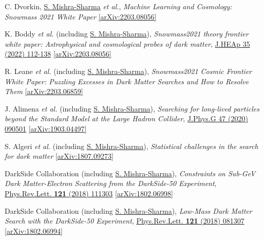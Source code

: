 \documentclass[letterpaper,11pt]{article}
\newenvironment{packed_enumerate}[1][]{
\begin{etaremune}[#1]
  \setlength{\itemsep}{3.7pt}
  \setlength{\parskip}{0pt}
  \setlength{\parsep}{0pt}}{\end{etaremune}
}
\begin{document}
\begin{packed_enumerate}[start=7]

  \item C. Dvorkin, \underline{S. Mishra-Sharma} \emph{et al.}, \emph{Machine Learning and Cosmology: Snowmass 2021 White Paper} \href{https://arxiv.org/abs/2203.08056}{[arXiv:2203.08056]}

  \item K. Boddy \emph{et al.} (including \underline{S. Mishra-Sharma}), \emph{Snowmass2021 theory frontier white paper: Astrophysical and cosmological probes of dark matter},  \href{https://www.sciencedirect.com/science/article/pii/S2214404822000349}{J.HEAp 35 (2022) 112-138}  \href{https://arxiv.org/abs/2203.08056}{[arXiv:2203.08056]}

  \item R. Leane \emph{et al.} (including \underline{S. Mishra-Sharma}), \emph{Snowmass2021 Cosmic Frontier White Paper: Puzzling Excesses in Dark Matter Searches and How to Resolve Them} \href{https://arxiv.org/abs/2203.06859}{[arXiv:2203.06859]}

  \item J. Alimena \emph{et al.} (including \underline{S. Mishra-Sharma}), \emph{Searching for long-lived particles beyond the Standard Model at the Large Hadron Collider}, \href{https://iopscience.iop.org/article/10.1088/1361-6471/ab4574}{J.Phys.G 47 (2020) 090501} \href{https://arxiv.org/abs/1903.04497}{[arXiv:1903.04497]}

  \item S. Algeri \emph{et al.} (including \underline{S. Mishra-Sharma}), \emph{Statistical challenges in the search for dark matter} \href{https://arxiv.org/abs/1807.09273}{[arXiv:1807.09273]}

  \item DarkSide Collaboration (including \underline{S. Mishra-Sharma}), \emph{Constraints on Sub-GeV Dark Matter-Electron Scattering from the DarkSide-50 Experiment}, \href{https://journals.aps.org/prl/abstract/10.1103/PhysRevLett.121.111303}{Phys.Rev.Lett. \textbf{121} (2018) 111303} \href{https://arxiv.org/abs/1802.06998}{[arXiv:1802.06998]}

  \item DarkSide Collaboration (including \underline{S. Mishra-Sharma}), \emph{Low-Mass Dark Matter Search with the DarkSide-50 Experiment}, \href{https://journals.aps.org/prl/abstract/10.1103/PhysRevLett.121.081307}{Phys.Rev.Lett. \textbf{121} (2018) 081307}  \href{https://arxiv.org/abs/1802.06994}{[arXiv:1802.06994]}
\end{packed_enumerate}
\vspace{2.0mm}
\end{document}
